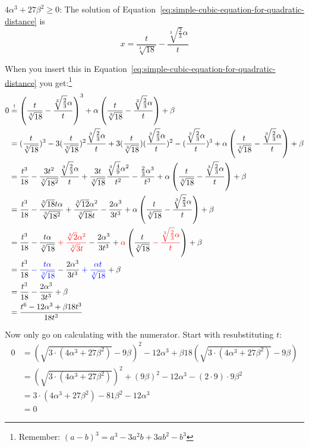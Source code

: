 $4 \alpha^3 + 27 \beta^2 \geq 0$:
The solution of Equation~\ref{eq:simple-cubic-equation-for-quadratic-distance}
is
\[x = \frac{t}{\sqrt[3]{18}} - \frac{\sqrt[3]{\frac{2}{3}} \alpha }{t}\]

When you insert this in Equation~\ref{eq:simple-cubic-equation-for-quadratic-distance}
you get:\footnote{Remember: $(a-b)^3 = a^3-3 a^2 b+3 a b^2-b^3$}
\allowdisplaybreaks
\begin{align}
    0 &\stackrel{!}{=} \left (\frac{t}{\sqrt[3]{18}} - \frac{\sqrt[3]{\frac{2}{3}} \alpha }{t} \right )^3 + \alpha \left (\frac{t}{\sqrt[3]{18}} - \frac{\sqrt[3]{\frac{2}{3}} \alpha }{t} \right ) + \beta\\
&= (\frac{t}{\sqrt[3]{18}})^3 
    - 3 (\frac{t}{\sqrt[3]{18}})^2 \frac{\sqrt[3]{\frac{2}{3}} \alpha }{t} 
    + 3 (\frac{t}{\sqrt[3]{18}})(\frac{\sqrt[3]{\frac{2}{3}} \alpha }{t})^2 
    - (\frac{\sqrt[3]{\frac{2}{3}} \alpha }{t})^3 
    + \alpha \left (\frac{t}{\sqrt[3]{18}} - \frac{\sqrt[3]{\frac{2}{3}} \alpha }{t} \right ) + \beta\\
&= \frac{t^3}{18}             
    - \frac{3t^2}{\sqrt[3]{18^2}} \frac{\sqrt[3]{\frac{2}{3}} \alpha }{t}
    + \frac{3t}{\sqrt[3]{18}} \frac{\sqrt[3]{\frac{4}{9}} \alpha^2 }{t^2} 
    - \frac{\frac{2}{3} \alpha^3 }{t^3} 
    + \alpha \left (\frac{t}{\sqrt[3]{18}} - \frac{\sqrt[3]{\frac{2}{3}} \alpha }{t} \right ) + \beta\\
&= \frac{t^3}{18}
    - \frac{\sqrt[3]{18} t \alpha}{\sqrt[3]{18^2}}
    + \frac{\sqrt[3]{12} \alpha^2}{\sqrt[3]{18} t}  
    - \frac{2 \alpha^3 }{3t^3} 
    + \alpha \left (\frac{t}{\sqrt[3]{18}} - \frac{\sqrt[3]{\frac{2}{3}} \alpha }{t} \right ) + \beta\\
&= \frac{t^3}{18} 
    - \frac{t \alpha}{\sqrt[3]{18}} 
    \color{red}+ \frac{\sqrt[3]{2} \alpha^2}{\sqrt[3]{3} t} \color{black}
    - \frac{2 \alpha^3 }{3 t^3} 
    + \color{red}\alpha \color{black} \left (\frac{t}{\sqrt[3]{18}}  \color{red}- \frac{\sqrt[3]{\frac{2}{3}} \alpha }{t} \color{black}\right ) 
    + \beta\\
&= \frac{t^3}{18} \color{blue}- \frac{t \alpha}{\sqrt[3]{18}} \color{black} 
    - \frac{2 \alpha^3 }{3 t^3} 
    \color{blue}+ \frac{\alpha t}{\sqrt[3]{18}} \color{black} 
    + \beta\\
&= \frac{t^3}{18} - \frac{2 \alpha^3 }{3 t^3} + \beta\\
&= \frac{t^6 - 12 \alpha^3 + \beta 18 t^3}{18t^3}
\end{align}

Now only go on calculating with the numerator. Start with resubstituting
$t$:
\begin{align}
0 &= (\sqrt{3 \cdot (4 \alpha^3 + 27 \beta^2)} -9\beta)^2 - 12 \alpha^3 + \beta 18 (\sqrt{3 \cdot (4 \alpha^3 + 27 \beta^2)} -9\beta)\\
&= (\sqrt{3 \cdot (4 \alpha^3 + 27 \beta^2)})^2 +(9\beta)^2 - 12 \alpha^3 -(2 \cdot 9)\cdot 9\beta^2\\
&= 3 \cdot (4 \alpha^3 + 27 \beta^2) -81 \beta^2 - 12 \alpha^3\\
&= 0
\end{align}
